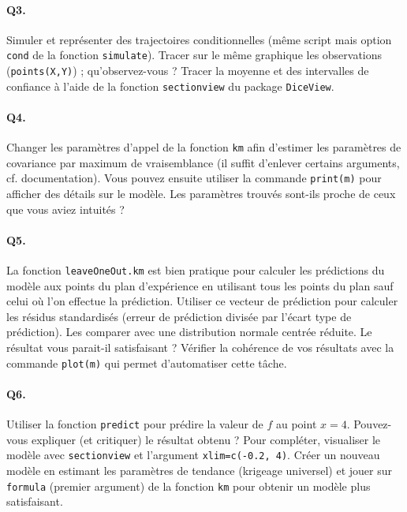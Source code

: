 \documentclass[12pt]{scrartcl}
\begin{document}
\paragraph{Q3.} Simuler et représenter des trajectoires conditionnelles (même script mais option \texttt{cond} de la fonction \texttt{simulate}). Tracer sur le même graphique les observations (\texttt{points(X,Y)}) ; qu'observez-vous ?
Tracer la moyenne et des intervalles de confiance à l'aide de la fonction \texttt{sectionview} du package \texttt{DiceView}.

\paragraph{Q4.} Changer les paramètres d'appel de la fonction \texttt{km} afin d'estimer les paramètres de covariance par maximum de vraisemblance (il suffit d'enlever certains arguments, cf. documentation). 
Vous pouvez ensuite utiliser la commande \texttt{print(m)} pour afficher des détails sur le modèle. Les paramètres trouvés sont-ils proche de ceux que vous aviez intuités ?

\paragraph{Q5.} La fonction \texttt{leaveOneOut.km} est bien pratique pour calculer les prédictions du modèle aux points du plan d'expérience en utilisant tous les points du plan sauf celui où l'on effectue la prédiction. 
Utiliser ce vecteur de prédiction pour calculer les résidus standardisés (erreur de prédiction divisée par l'écart type de prédiction). Les comparer avec une distribution normale centrée réduite. Le résultat vous parait-il satisfaisant ?  
Vérifier la cohérence de vos résultats avec la commande \texttt{plot(m)} qui permet d'automatiser cette tâche.

\paragraph{Q6.} Utiliser la fonction \texttt{predict} pour prédire la valeur de $f$ au point $x=4$. Pouvez-vous expliquer (et critiquer) le résultat obtenu ? Pour compléter, visualiser le modèle avec \texttt{sectionview} et l'argument
\texttt{xlim=c(-0.2, 4)}. Créer un nouveau modèle en estimant les paramètres de tendance (krigeage universel) et jouer sur \texttt{formula} (premier argument) de la fonction \texttt{km} pour obtenir un modèle plus satisfaisant.

\end{document}
